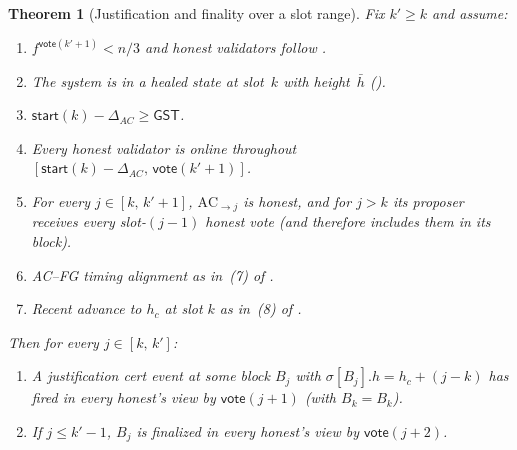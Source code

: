 \ifx\litemode\undefined\documentclass{article}\fi
\newcommand{\start}{\mathsf{start}}
\newcommand{\vote}{\mathsf{vote}}
\newcommand{\comm}[1]{\bar{#1}}
\theoremstyle{plain}
\newtheorem{theorem}{Theorem}
\theoremstyle{definition}
\theoremstyle{remark}
\newcommand{\GST}{\ensuremath{\mathsf{GST}}}
\begin{document}
\begin{theorem}[Justification and finality over a slot range]\label{rev:thm:per-round-range}
Fix $k' \geq k$ and assume:
\begin{enumerate}
  \item $f^{\vote(k'+1)} < n/3$ and honest validators follow .
  \item The system is in a healed state at slot~$k$ with height~$\comm{h}$ ().
  \item $\start(k) - \Delta_{AC} \geq \GST$.
  \item Every honest validator is online throughout $[\start(k) - \Delta_{AC},\, \vote(k'+1)]$.
  \item For every $j \in [k,\, k'+1]$, $\mathrm{AC}_{\to j}$ is honest, and for $j > k$ its proposer receives every slot-$(j{-}1)$ honest vote (and therefore includes them in its block).
  \item AC--FG timing alignment as in~(7) of .
  \item Recent advance to $h_c$ at slot $k$ as in~(8) of .
\end{enumerate}

Then for every $j \in [k,\, k']$:
\begin{enumerate}
  \item[\textnormal{(T1)}] A justification cert event at some block $B_j$ with $\sigma[B_j].h = h_c + (j - k)$ has fired in every honest's view by $\vote(j+1)$ (with $B_k = B_k$).
  \item[\textnormal{(T2)}] If $j \leq k' - 1$, $B_j$ is finalized in every honest's view by $\vote(j+2)$.
\end{enumerate}
\end{theorem}
\end{document}
